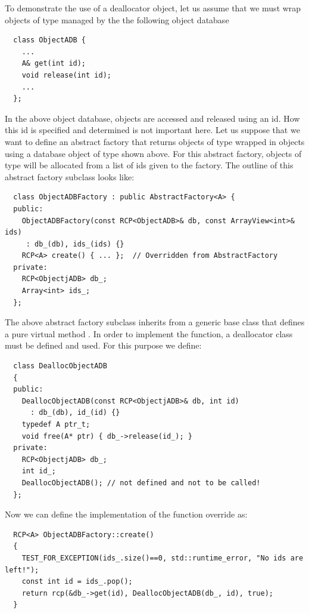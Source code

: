 \documentclass[pdf,ps2pdf,11pt]{SANDreport}
\begin{document}
To demonstrate the use of a deallocator object, let us assume that we
must wrap objects of type {} managed by the the following
object database

{\small\begin{verbatim}
  class ObjectADB {
    ...
    A& get(int id);
    void release(int id);
    ...
  };
\end{verbatim}}

In the above object database, objects are accessed and released using
an id.  How this id is specified and determined is not important here.
Let us suppose that we want to define an abstract factory that returns
objects of type {} wrapped in {} objects
using a database object of type {} shown above.  For
this abstract factory, objects of type {} will be allocated
from a list of ids given to the factory.  The outline of this abstract
factory subclass looks like:

{\small\begin{verbatim}
  class ObjectADBFactory : public AbstractFactory<A> {
  public:
    ObjectADBFactory(const RCP<ObjectADB>& db, const ArrayView<int>& ids)
     : db_(db), ids_(ids) {}
    RCP<A> create() { ... };  // Overridden from AbstractFactory
  private:
    RCP<ObjectjADB> db_;
    Array<int> ids_;
  };
\end{verbatim}}

The above abstract factory subclass {}
inherits from a generic {} base class that
defines a pure virtual method {}.  In order to
implement the {} function, a deallocator class must
be defined and used.  For this purpose we define:

{\small\begin{verbatim}
  class DeallocObjectADB
  {
  public:
    DeallocObjectADB(const RCP<ObjectjADB>& db, int id)
      : db_(db), id_(id) {}
    typedef A ptr_t;
    void free(A* ptr) { db_->release(id_); }
  private:
    RCP<ObjectjADB> db_;
    int id_;
    DeallocObjectADB(); // not defined and not to be called!
  };
\end{verbatim}}

Now we can define the implementation of the {}
function override as:

{\small\begin{verbatim}
  RCP<A> ObjectADBFactory::create()
  {
    TEST_FOR_EXCEPTION(ids_.size()==0, std::runtime_error, "No ids are left!");
    const int id = ids_.pop();
    return rcp(&db_->get(id), DeallocObjectADB(db_, id), true);
  }
\end{verbatim}}
\end{document}
